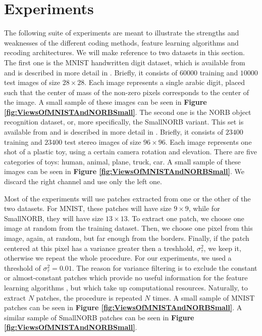 \documentclass[12pt,a4paper,oneside,english]{UPBThesis}
\newcommand{\hctimes}[2]{{#1}\!\times\!{#2}}
\begin{document}
\chapter{Experiments}
\label{chap:Experiments}

The following suite of experiments are meant to illustrate the strengths and weaknesses of the different coding methods, feature learning algorithms and recoding architectures. We will make reference to two datasets in this section. The first one is the MNIST handwritten digit dataset, which is available from \cite{mnist-website} and is described in more detail in \cite{gradient-based-learning}. Briefly, it consists of $60000$ training and $10000$ test images of size $\hctimes{28}{28}$. Each image represents a single arabic digit, placed such that the center of mass of the non-zero pixels corresponds to the center of the image. A small sample of these images can be seen in \textbf{Figure \ref{fig:ViewsOfMNISTAndNORBSmall}}. The second one is the NORB object recognition dataset, or, more specifically, the SmallNORB variant. This set is available from \cite{norbsmall-website} and is described in more detail in \cite{learning-methods-invariance-pose-lighting}. Briefly, it consists of $23400$ training and $23400$ test stereo images of size $\hctimes{96}{96}$. Each image represents one shot of a plastic toy, using a certain camera rotation and elevation. There are five categories of toys: human, animal, plane, truck, car. A small sample of these images can be seen in \textbf{Figure \ref{fig:ViewsOfMNISTAndNORBSmall}}. We discard the right channel and use only the left one.

Most of the experiments will use patches extracted from one or the other of the two datasets. For MNIST, these patches will have size $\hctimes{9}{9}$, while for SmallNORB, they will have size $\hctimes{13}{13}$. To extract one patch, we choose one image at random from the training dataset. Then, we choose one pixel from this image, again, at random, but far enough from the borders. Finally, if the patch centered at this pixel has a variance greater then a treshhold, $\sigma^2_\tau$, we keep it, otherwise we repeat the whole procedure. For our experiments, we used a threshold of $\sigma^2_\tau = 0.01$. The reason for variance filtering is to exclude the constant or almost-constant patches which provide no useful information for the feature learning algorithms \cite{simple-method-sparse-coding,tiny-images}, but which take up computational resources. Naturally, to extract $N$ patches, the procedure is repeated $N$ times. A small sample of MNIST patches can be seen in \textbf{Figure \ref{fig:ViewsOfMNISTAndNORBSmall}}. A similar sample of SmallNORB patches can be seen in \textbf{Figure \ref{fig:ViewsOfMNISTAndNORBSmall}}.
\end{document}
